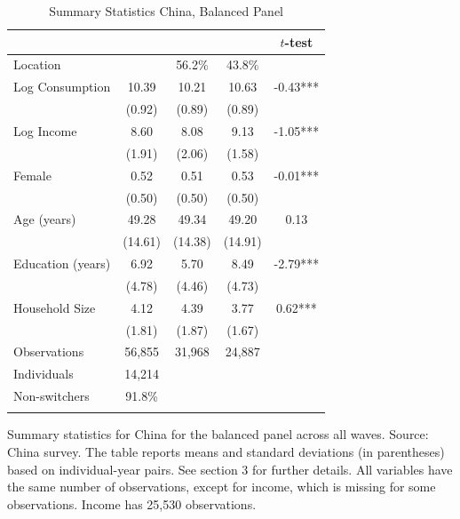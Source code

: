 \begin{table}[htbp] \centering \caption{Summary Statistics China, Balanced Panel}\label{tab:summary_stats_CHN_bal} \begin{threeparttable} \begin{tabular}{l cccc} \toprule
 &  &  &  & $t$-test \\
\midrule
Location &  &   56.2\% &   43.8\% &  \\  \addlinespace \addlinespace
Log Consumption & 10.39 & 10.21 & 10.63 & -0.43*** \\
 & (0.92) & (0.89) & (0.89) &  \\  \addlinespace
Log Income & 8.60 & 8.08 & 9.13 & -1.05*** \\
 & (1.91) & (2.06) & (1.58) &  \\  \addlinespace
Female & 0.52 & 0.51 & 0.53 & -0.01*** \\
 & (0.50) & (0.50) & (0.50) &  \\  \addlinespace
Age (years) & 49.28 & 49.34 & 49.20 & 0.13 \\
 & (14.61) & (14.38) & (14.91) &  \\  \addlinespace
Education (years) & 6.92 & 5.70 & 8.49 & -2.79*** \\
 & (4.78) & (4.46) & (4.73) &  \\  \addlinespace
Household Size & 4.12 & 4.39 & 3.77 & 0.62*** \\
 & (1.81) & (1.87) & (1.67) &  \\  \addlinespace


\cmidrule{2-5}
Observations & 56,855 & 31,968 & 24,887 &  \\  \addlinespace
Individuals & 14,214 &  &  &  \\
Non-switchers &   91.8\% &  &  &  \\  \addlinespace
\bottomrule \end{tabular} \begin{tablenotes}[flushleft] \footnotesize \item{Summary statistics for China for the balanced panel across all waves. Source: China survey. The table reports means and standard deviations (in parentheses) based on individual-year pairs. See section 3 for further details. All variables have the same number of observations, except for income, which is missing for some observations. Income has 25,530 observations.} \end{tablenotes} \end{threeparttable} \end{table}